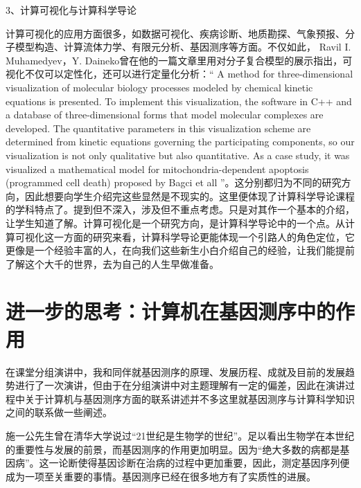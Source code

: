 \documentclass{article}
\begin{document}
 3、计算可视化与计算科学导论\par 
  计算可视化的应用方面很多，如数据可视化、疾病诊断、地质勘探、气象预报、分子模型构造、计算流体力学、有限元分析、基因测序等方面。不仅如此，
  Ravil I. Muhamedyev，Y. Daineko曾在他的一篇文章里用对分子复合模型的展示指出，可视化不仅可以定性化，还可以进行定量化分析：“ A method for three-dimensional visualization of molecular biology processes modeled by chemical kinetic equations is presented. To implement this visualization, the software in C++ and a database of three-dimensional forms that model molecular complexes are developed. The quantitative parameters in this visualization scheme are determined from kinetic equations governing the participating components, so our visualization is not only qualitative but also quantitative. As a case study, it was visualized a mathematical model for mitochondria-dependent apoptosis (programmed cell death) proposed by Bagci et all ”。\citep{e}这分别都归为不同的研究方向，因此想要向学生介绍完这些显然是不现实的。这里便体现了计算科学导论课程的学科特点了。提到但不深入，涉及但不重点考虑。只是对其作一个基本的介绍，让学生知道了解。计算可视化是一个研究方向，是计算科学导论中的一个点。从计算可视化这一方面的研究来看，计算科学导论更能体现一个引路人的角色定位，它更像是一个经验丰富的人，在向我们这些新生小白介绍自己的经验，让我们能提前了解这个大千的世界，去为自己的人生早做准备。\par 

\section{进一步的思考：计算机在基因测序中的作用}
在课堂分组演讲中，我和同伴就基因测序的原理、发展历程、成就及目前的发展趋势进行了一次演讲，但由于在分组演讲中对主题理解有一定的偏差，因此在演讲过程中关于计算机与基因测序方面的联系讲述并不多这里就基因测序与计算科学知识之间的联系做一些阐述。\par
施一公先生曾在清华大学说过“21世纪是生物学的世纪”。足以看出生物学在本世纪的重要性与发展的前景，而基因测序的作用更加明显。因为“绝大多数的病都是基因病”。这一论断使得基因诊断在治病的过程中更加重要，因此，测定基因序列便成为一项至关重要的事情。基因测序已经在很多地方有了实质性的进展。\par 
  
\end{document}
